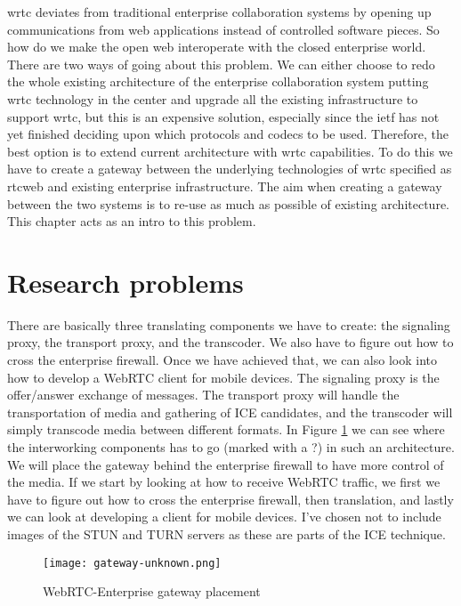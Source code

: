 \gls{wrtc} deviates from traditional enterprise collaboration systems by opening up communications from web applications instead of controlled software pieces. So how do we make the open web interoperate with the closed enterprise world. There are two ways of going about this problem. We can either choose to redo the whole existing architecture of the enterprise collaboration system putting \gls{wrtc} technology in the center and upgrade all the existing infrastructure to support \gls{wrtc}, but this is an expensive solution, especially since the \gls{ietf} has not yet finished deciding upon which protocols and codecs to be used. Therefore, the best option is to extend current architecture with \gls{wrtc} capabilities. To do this we have to create a gateway between the underlying technologies of \gls{wrtc} specified as \gls{rtcweb} and existing enterprise infrastructure. The aim when creating a gateway between the two systems is to re-use as much as possible of existing architecture. This chapter acts as an intro to this problem.

\section{Research problems}
There are basically three translating components we have to create: the signaling proxy, the transport proxy, and the transcoder. We also have to figure out how to cross the enterprise firewall. Once we have achieved that, we can also look into how to develop a WebRTC client for mobile devices. The signaling proxy is the offer/answer exchange of messages. The transport proxy will handle the transportation of media and gathering of ICE candidates, and the transcoder will simply transcode media between different formats. In Figure \ref{fig:gateway-layers} we can see where the interworking components has to go (marked with a ?) in such an architecture. We will place the gateway behind the enterprise firewall to have more control of the media. If we start by looking at how to receive WebRTC traffic, we first we have to figure out how to cross the enterprise firewall, then translation, and lastly we can look at developing a client for mobile devices. I've chosen not to include images of the STUN and TURN servers as these are parts of the ICE technique.
\\
\begin{figure}[here]
\centerline{\texttt{[image: gateway-unknown.png]}}
\caption{WebRTC-Enterprise gateway placement}
\label{fig:gateway-layers}
\end{figure}

